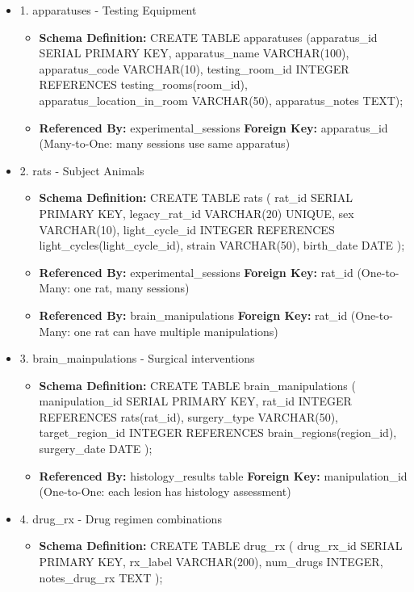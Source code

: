 \documentclass[12pt, titlepage]{article}
\begin{document}
\begin{itemize}

\item 1. apparatuses - Testing Equipment
\begin{itemize}
	\item{\textbf{Schema Definition: }CREATE TABLE apparatuses (apparatus\_id SERIAL PRIMARY KEY, apparatus\_name VARCHAR(100), apparatus\_code VARCHAR(10),
	      testing\_room\_id INTEGER REFERENCES testing\_rooms(room\_id),
	      \\ apparatus\_location\_in\_room VARCHAR(50),
	      apparatus\_notes TEXT);}
	\item{\textbf{Referenced By: }experimental\_sessions \textbf{Foreign Key: }apparatus\_id (Many-to-One: many sessions use same apparatus)}
\end{itemize}
\item 2. rats - Subject Animals
\begin{itemize}
	\item{\textbf{Schema Definition: }CREATE TABLE rats (
	      rat\_id SERIAL PRIMARY KEY,
	      legacy\_rat\_id VARCHAR(20) UNIQUE,
	      sex VARCHAR(10),
	      light\_cycle\_id INTEGER REFERENCES light\_cycles(light\_cycle\_id),
	      strain VARCHAR(50),
	      birth\_date DATE
	      );
	      }
	\item{\textbf{Referenced By: }experimental\_sessions \textbf{Foreign Key: }rat\_id (One-to-Many: one rat, many sessions)}
	\item{\textbf{Referenced By: }brain\_manipulations \textbf{Foreign Key: }rat\_id (One-to-Many: one rat can have multiple manipulations)}
\end{itemize}
\item 3. brain\_mainpulations - Surgical interventions
\begin{itemize}
	\item{\textbf{Schema Definition: }CREATE TABLE brain\_manipulations (
	      manipulation\_id SERIAL PRIMARY KEY,
	      rat\_id INTEGER REFERENCES rats(rat\_id),
	      surgery\_type VARCHAR(50),
	      target\_region\_id INTEGER REFERENCES brain\_regions(region\_id),
	      surgery\_date DATE
	      );

	      }
	\item{\textbf{Referenced By: }histology\_results table \textbf{Foreign Key: }manipulation\_id (One-to-One: each lesion has histology assessment)}
\end{itemize}
\item 4. drug\_rx - Drug regimen combinations
\begin{itemize}
	\item{\textbf{Schema Definition: }CREATE TABLE drug\_rx (
	      drug\_rx\_id SERIAL PRIMARY KEY,
	      rx\_label VARCHAR(200),
	      num\_drugs INTEGER,
	      notes\_drug\_rx TEXT
	      );

}
\end{itemize}
\end{itemize}
\end{document}
